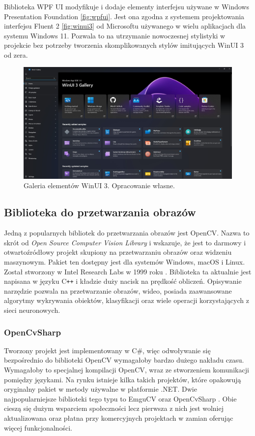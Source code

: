 Biblioteka WPF UI \cite{wpfui} modyfikuje i dodaje elementy interfejsu używane w Windows Presentation Foundation \autoref{fig:wpfui}. 
Jest ona zgodna z systemem projektowania interfejsu Fluent 2 \autoref{fig:winui3} od Microsoftu używanego w wielu aplikacjach dla systemu Windows 11. 
Pozwala to na utrzymanie nowoczesnej stylistyki w projekcie bez potrzeby tworzenia skomplikowanych stylów imitujących WinUI 3 od zera.

\begin{figure}[H]
    \centering
    \includegraphics[width=0.9\linewidth]{./images/Picture9.jpg}
    \caption{Galeria elementów WinUI 3. Opracowanie własne.}
    \label{fig:winui3}
\end{figure}

\subsection{Biblioteka do przetwarzania obrazów}
Jedną z popularnych bibliotek do przetwarzania obrazów jest OpenCV.
Nazwa to skrót od \textit{Open Source Computer Vision Library} i wskazuje, że jest to darmowy i otwartoźródłowy projekt skupiony na przetwarzaniu obrazów oraz widzeniu maszynowym.
Pakiet ten dostępny jest dla systemów Windows, macOS i Linux. 
Został stworzony w Intel Research Labs w 1999 roku \cite{opencvHistory}. 
Biblioteka ta aktualnie jest napisana w języku C\texttt{++} i kładzie duży nacisk na prędkość obliczeń. 
Opisywanie narzędzie pozwala na przetwarzanie obrazów, wideo, posiada zaawansowane algorytmy wykrywania obiektów, klasyfikacji oraz wiele operacji korzystających z sieci neuronowych.

\subsubsection{OpenCvSharp}

Tworzony projekt jest implementowany w C\#, więc odwoływanie się bezpośrednio do biblioteki OpenCV wymagałoby bardzo dużego nakładu czasu. Wymagałoby to specjalnej kompilacji OpenCV, wraz ze stworzeniem komunikacji pomiędzy językami. Na rynku istnieje kilka takich projektów, które opakowują oryginalny pakiet w metody używalne w platformie .NET. Dwie najpopularniejsze biblioteki tego typu to EmguCV \cite{emgucv} oraz OpenCvSharp \cite{opencvsharp}. 
Obie cieszą się dużym wsparciem społeczności lecz pierwsza z nich jest wolniej aktualizowana oraz płatna przy komercyjnych projektach w zamian oferując więcej funkcjonalności.

